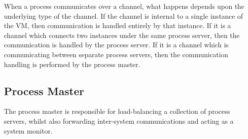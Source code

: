 When a process communicates over a channel, what happens depends upon the
underlying type of the channel. If the channel is internal to a single instance
of the VM, then communication is handled entirely by that instance. If it is a
channel which connects two instances under the same process server, then the
communication is handled by the process server. If it is a channel which is
communicating between separate process servers, then the communication handling
is performed by the process master.

\subsection{Process Master}

The process master is responsible for load-balancing a collection of process
servers, whilst also forwarding inter-system communications and acting as a
system monitor.

